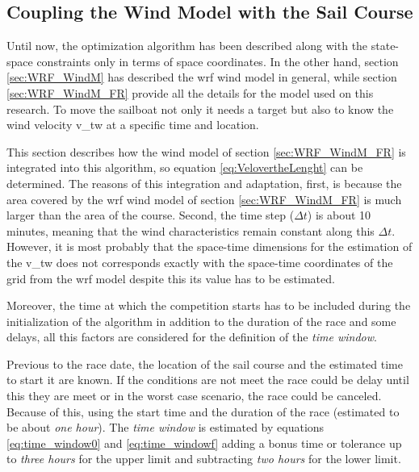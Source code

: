 \subsection{Coupling the Wind Model with the Sail Course} \label{sec:SailinArea_WindModel} %
Until now, the optimization algorithm has been described along with the state-space constraints only in terms of space coordinates. In the other hand, section \ref{sec:WRF_WindM} has described the \acrshort{wrf} wind model in general, while section \ref{sec:WRF_WindM_FR} provide all the details for the model used on this research. To move the sailboat not only it needs a target but also to know the wind velocity \acrshort{v_tw} at a specific time and location.\par \noindent %
This section describes how the wind model of section \ref{sec:WRF_WindM_FR} is integrated into this algorithm, so equation \ref{eq:VelovertheLenght} can be determined. The reasons of this integration and adaptation, first, is because the area covered by the \acrshort{wrf} wind model of section \ref{sec:WRF_WindM_FR} is much larger than the area of the course. Second, the time step ($\Delta t$) is about 10 minutes, meaning that the wind characteristics remain constant along this $\Delta t$. However, it is most probably that the space-time dimensions for the estimation of the \acrshort{v_tw} does not corresponds exactly with the space-time coordinates of the grid from the \acrshort{wrf} model despite this its value has to be estimated. \par \noindent Moreover, the time at which the competition starts has to be included during the initialization of the algorithm in addition to the duration of the race and some delays, all this factors are considered for the definition of the \textit{time window}.\par

Previous to the race date, the location of the sail course and the estimated time to start it are known. If the conditions are not meet the race could be delay until this they are meet or in the worst case scenario, the race could be canceled. Because of this, using the start time and the duration of the race (estimated to be about \textit{one hour}). The \textit{time window} is estimated by equations \ref{eq:time_window0} and \ref{eq:time_windowf} adding a bonus time or tolerance up to \textit{three hours} for the upper limit and subtracting \textit{two hours} for the lower limit.

